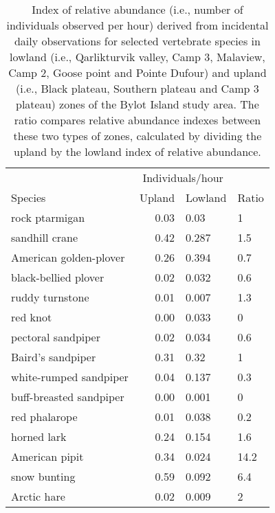 \begin{table}[ht]
\centering
\caption{Index of relative abundance (i.e., number of individuals observed per hour) derived from incidental daily observations for selected vertebrate species in lowland (i.e., Qarlikturvik valley, Camp 3, Malaview, Camp 2, Goose point and Pointe Dufour) and upland (i.e., Black plateau, Southern plateau and Camp 3 plateau) zones of the Bylot Island study area. The ratio compares relative abundance indexes between these two types of zones, calculated by dividing the upland by the lowland index of relative abundance.} 
\label{table:species_relative_abundance_upland}
\begingroup\fontsize{10pt}{10pt}\selectfont
\begin{tabularx}{0.55\textwidth}{lrll}
  \hline
  & \multicolumn{2}{c}{Individuals/hour} \\
 Species & Upland & Lowland & Ratio \\
 \hline
rock ptarmigan & 0.03 & 0.03 & 1 \\ 
  sandhill crane & 0.42 & 0.287 & 1.5 \\ 
  American golden-plover & 0.26 & 0.394 & 0.7 \\ 
  black-bellied plover & 0.02 & 0.032 & 0.6 \\ 
  ruddy turnstone & 0.01 & 0.007 & 1.3 \\ 
  red knot & 0.00 & 0.033 & 0 \\ 
  pectoral sandpiper & 0.02 & 0.034 & 0.6 \\ 
  Baird's sandpiper & 0.31 & 0.32 & 1 \\ 
  white-rumped sandpiper & 0.04 & 0.137 & 0.3 \\ 
  buff-breasted sandpiper & 0.00 & 0.001 & 0 \\ 
  red phalarope & 0.01 & 0.038 & 0.2 \\ 
  horned lark & 0.24 & 0.154 & 1.6 \\ 
  American pipit & 0.34 & 0.024 & 14.2 \\ 
  snow bunting & 0.59 & 0.092 & 6.4 \\ 
  Arctic hare & 0.02 & 0.009 & 2 \\ 
   \hline
\end{tabularx}
\endgroup
\end{table}
